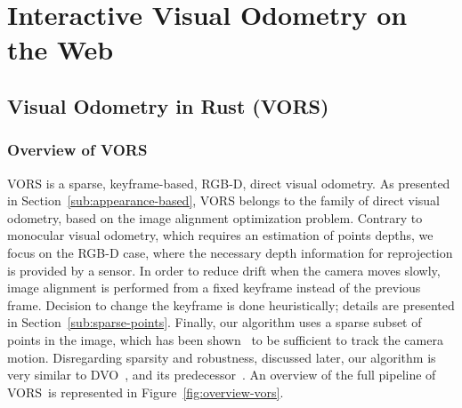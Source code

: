 \chapter{Interactive Visual Odometry on the Web}%
\label{cha:interactive_vo_on_the_web}

\minitoc%
\clearpage

\section{Visual Odometry in Rust (VORS)}%
\label{sec:vors}

\subsection{Overview of VORS}%
\label{sub:vors-overview}

VORS is a sparse, keyframe-based, RGB-D, direct visual odometry.
As presented in Section~\ref{sub:appearance-based},
VORS belongs to the family of direct visual odometry,
based on the image alignment optimization problem.
Contrary to monocular visual odometry, which requires an estimation
of points depths, we focus on the RGB-D case,
where the necessary depth information for reprojection is provided by a sensor.
In order to reduce drift when the camera moves slowly,
image alignment is performed from a fixed keyframe instead of the previous frame.
Decision to change the keyframe is done heuristically;
details are presented in Section~\ref{sub:sparse-points}.
Finally, our algorithm uses a sparse subset of points in the image,
which has been shown~\cite{engel2017direct} to be sufficient to track the camera motion.
Disregarding sparsity and robustness, discussed later,
our algorithm is very similar to DVO~\cite{kerl2013robust},
and its predecessor~\cite{steinbrucker2011real}.
An overview of the full pipeline of VORS is represented in Figure~\ref{fig:overview-vors}.


